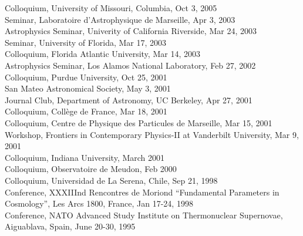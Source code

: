 \documentclass[line, margin]{res}
\begin{document}
\begin{resume}
Colloquium, University of Missouri, Columbia, Oct 3, 2005\\
Seminar, Laboratoire d'Astrophysique de Marseille, Apr 3, 2003\\
Astrophysics Seminar, Univerity of California Riverside, Mar 24, 2003\\
Seminar, University of Florida, Mar 17, 2003\\
Colloquium, Florida Atlantic University, Mar 14, 2003\\
Astrophysics Seminar, Los Alamos National Laboratory, Feb 27, 2002\\
Colloquium, Purdue University, Oct 25, 2001\\
San Mateo Astronomical Society, May 3, 2001\\
Journal Club, Department of Astronomy, UC Berkeley, Apr 27, 2001\\
Colloquium, Coll\`ege de France, Mar 18, 2001\\
Colloquium, Centre de Physique des Particules de Marseille, Mar 15, 2001\\
Workshop, Frontiers in Contemporary Physics-II at Vanderbilt University, Mar 9, 2001\\
Colloquium, Indiana University, March 2001\\
Colloquium, Observatoire de Meudon, Feb 2000\\
Colloquium, Universidad de La Serena,
Chile, Sep 21, 1998\\
Conference,  XXXIIInd
Rencontres de Moriond ``Fundamental Parameters in Cosmology'',
Les Arcs 1800, France, Jan 17-24, 1998\\
Conference, NATO Advanced Study Institute on Thermonuclear Supernovae, Aiguablava,
Spain, June 20-30, 1995\\


\end{resume}
\end{document}
